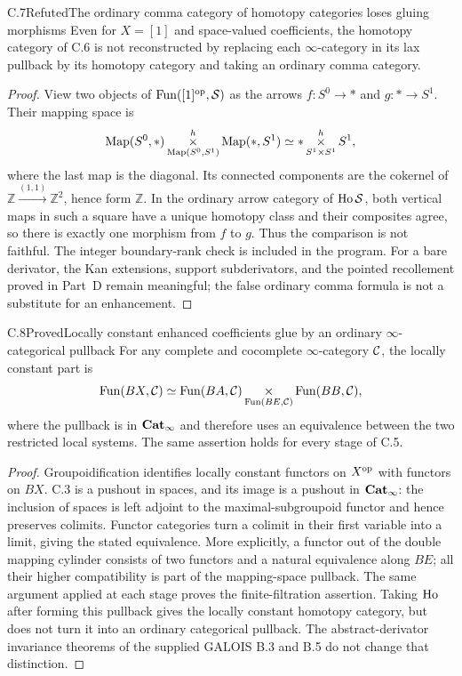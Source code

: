 \begin{statement}{C.7}{Refuted}{The ordinary comma category of homotopy categories loses gluing morphisms}
Even for $X=[1]$ and space-valued coefficients, the homotopy category of C.6 is not reconstructed by replacing each $\infty$-category in its lax pullback by its homotopy category and taking an ordinary comma category.
\end{statement}
\begin{proof}
View two objects of $\operatorname{Fun}([1]^{\mathrm{op}},\mathcal S)$ as the arrows $f:S^0\to *$ and $g:*\to S^1$. Their mapping space is
\[
 \operatorname{Map}(S^0,*)\mathop{\times}^{h}_{\operatorname{Map}(S^0,S^1)}\operatorname{Map}(*,S^1)
 \simeq *\mathop{\times}^{h}_{S^1\times S^1}S^1,
\]
where the last map is the diagonal. Its connected components are the cokernel of $\mathbb Z\xrightarrow{(1,1)}\mathbb Z^2$, hence form $\mathbb Z$. In the ordinary arrow category of $\operatorname{Ho}\mathcal S$, both vertical maps in such a square have a unique homotopy class and their composites agree, so there is exactly one morphism from $f$ to $g$. Thus the comparison is not faithful. The integer boundary-rank check is included in the program. For a bare derivator, the Kan extensions, support subderivators, and the pointed recollement proved in Part~D remain meaningful; the false ordinary comma formula is not a substitute for an enhancement.
\end{proof}

\begin{statement}{C.8}{Proved}{Locally constant enhanced coefficients glue by an ordinary $\infty$-categorical pullback}
For any complete and cocomplete $\infty$-category $\mathcal C$, the locally constant part is
\[
 \operatorname{Fun}(BX,\mathcal C)\simeq
 \operatorname{Fun}(BA,\mathcal C)\mathop{\times}_{\operatorname{Fun}(BE,\mathcal C)}\operatorname{Fun}(BB,\mathcal C),
\]
where the pullback is in $\mathbf{Cat}_\infty$ and therefore uses an equivalence between the two restricted local systems. The same assertion holds for every stage of C.5.
\end{statement}
\begin{proof}
Groupoidification identifies locally constant functors on $X^{\mathrm{op}}$ with functors on $BX$. C.3 is a pushout in spaces, and its image is a pushout in $\mathbf{Cat}_\infty$: the inclusion of spaces is left adjoint to the maximal-subgroupoid functor and hence preserves colimits. Functor categories turn a colimit in their first variable into a limit, giving the stated equivalence. More explicitly, a functor out of the double mapping cylinder consists of two functors and a natural equivalence along $BE$; all their higher compatibility is part of the mapping-space pullback. The same argument applied at each stage proves the finite-filtration assertion. Taking $\operatorname{Ho}$ after forming this pullback gives the locally constant homotopy category, but does not turn it into an ordinary categorical pullback. The abstract-derivator invariance theorems of the supplied GALOIS B.3 and B.5 do not change that distinction.
\end{proof}

